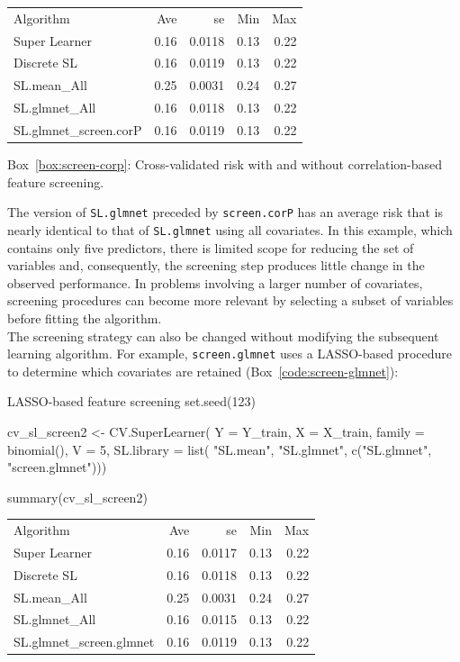 \documentclass[12pt]{article}
\newcommand{\routputcaption}[2]{%
    \par\smallskip
    \begin{center}
        Box~\ref{#1}: #2
    \end{center}
}
\begin{document}
\begin{routputboxref}[label={box:screen-corp}]
	\ttfamily
	\centering
	\begin{tabular}{lrrrr}
		Algorithm & Ave & se & Min & Max \\
		Super Learner & 0.16 & 0.0118 & 0.13 & 0.22 \\
		Discrete SL & 0.16 & 0.0119 & 0.13 & 0.22 \\
		SL.mean\_All & 0.25 & 0.0031 & 0.24 & 0.27 \\
		SL.glmnet\_All & 0.16 & 0.0118 & 0.13 & 0.22 \\
		SL.glmnet\_screen.corP & 0.16 & 0.0119 & 0.13 & 0.22 \\
	\end{tabular}
\end{routputboxref}

\routputcaption{box:screen-corp}
{Cross-validated risk with and without correlation-based feature screening.}

The version of \texttt{SL.glmnet} preceded by \texttt{screen.corP} has an average risk that is nearly identical to that of \texttt{SL.glmnet} using all covariates. In this example, which contains only five predictors, there is limited scope for reducing the set of variables and, consequently, the screening step produces little change in the observed performance. In problems involving a larger number of covariates, screening procedures can become more relevant by selecting a subset of variables before fitting the algorithm. \\
The screening strategy can also be changed without modifying the subsequent learning algorithm. For example, \texttt{screen.glmnet} uses a LASSO-based procedure to determine which covariates are retained (Box~\ref{code:screen-glmnet}):

\begin{rcode}[label={code:screen-glmnet}]{LASSO-based feature screening}
	set.seed(123)
	
	cv_sl_screen2 <- CV.SuperLearner(
	Y = Y_train, X = X_train,
	family = binomial(),
	V = 5,
	SL.library = list(
	"SL.mean",
	"SL.glmnet",
	c("SL.glmnet", "screen.glmnet")))
	
	summary(cv_sl_screen2)
\end{rcode}

\begin{routputboxref}[label={box:screen-glmnet}]
	\ttfamily
	\centering
	\begin{tabular}{lrrrr}
		Algorithm & Ave & se & Min & Max \\
		Super Learner & 0.16 & 0.0117 & 0.13 & 0.22 \\
		Discrete SL & 0.16 & 0.0118 & 0.13 & 0.22 \\
		SL.mean\_All & 0.25 & 0.0031 & 0.24 & 0.27 \\
		SL.glmnet\_All & 0.16 & 0.0115 & 0.13 & 0.22 \\
		SL.glmnet\_screen.glmnet & 0.16 & 0.0119 & 0.13 & 0.22 \\
	\end{tabular}
\end{routputboxref}
\end{document}

